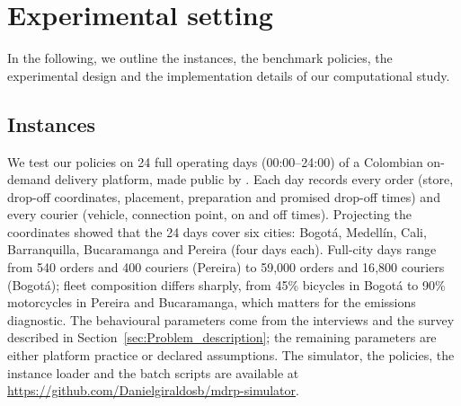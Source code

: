 \documentclass[a4paper,11pt,review,3p,authoryear]{elsarticle}
\begin{document}
\section{Experimental setting}
\label{sec:Experimental_setting}

In the following, we outline the instances, the benchmark policies, the experimental design and the implementation details of our computational study.

\subsection{Instances}
\label{sec:instances}

We test our policies on 24 full operating days (00:00--24:00) of a Colombian on-demand delivery platform, made public by \citet{quintero2020computational}. Each day records every order (store, drop-off coordinates, placement, preparation and promised drop-off times) and every courier (vehicle, connection point, on and off times). Projecting the coordinates showed that the 24 days cover six cities: Bogot\'a, Medell\'in, Cali, Barranquilla, Bucaramanga and Pereira (four days each). Full-city days range from 540 orders and 400 couriers (Pereira) to 59{,}000 orders and 16{,}800 couriers (Bogot\'a); fleet composition differs sharply, from 45\% bicycles in Bogot\'a to 90\% motorcycles in Pereira and Bucaramanga, which matters for the emissions diagnostic. The behavioural parameters come from the interviews and the survey described in Section~\ref{sec:Problem_description}; the remaining parameters are either platform practice or declared assumptions. The simulator, the policies, the instance loader and the batch scripts are available at \url{https://github.com/Danielgiraldosb/mdrp-simulator}.
\end{document}
